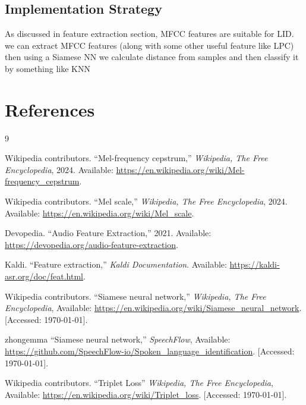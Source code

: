 \documentclass[12pt,a4paper]{article}
\begin{document}
	\subsection{Implementation Strategy}
As discussed in feature extraction section, MFCC features are suitable for LID. we can extract MFCC features (along with some other useful feature like LPC) then using a Siamese NN 
\cite{siamese_nn}
we calculate distance from samples and then classify it by something like KNN


	\section{References}
	\begin{thebibliography}{9}
		
		Wikipedia contributors.
		``Mel-frequency cepstrum,''
		\textit{Wikipedia, The Free Encyclopedia}, 2024.
		Available: \url{https://en.wikipedia.org/wiki/Mel-frequency_cepstrum}.
		
		Wikipedia contributors.
		``Mel scale,''
		\textit{Wikipedia, The Free Encyclopedia}, 2024.
		Available: \url{https://en.wikipedia.org/wiki/Mel_scale}.

		
		Devopedia.
		``Audio Feature Extraction,''
		2021.
		Available: \url{https://devopedia.org/audio-feature-extraction}. %
		
		Kaldi.
		``Feature extraction,''
		\textit{Kaldi Documentation}.
		Available: \url{https://kaldi-asr.org/doc/feat.html}. %
		
		
		Wikipedia contributors.
		``Siamese neural network,'' 
		\textit{Wikipedia, The Free Encyclopedia}, 
		Available: \url{https://en.wikipedia.org/wiki/Siamese_neural_network}. 
		[Accessed: \today].
		
		zhongemma
		``Siamese neural network,'' 
		\textit{SpeechFlow}, 
		Available: \url{https://github.com/SpeechFlow-io/Spoken_language_identification}. 
		[Accessed: \today].
		
		
		Wikipedia contributors.
		``Triplet Loss'' 
		\textit{Wikipedia, The Free Encyclopedia}, 
		Available: \url{https://en.wikipedia.org/wiki/Triplet_loss}. 
		[Accessed: \today].
		
	\end{thebibliography}
\end{document}

